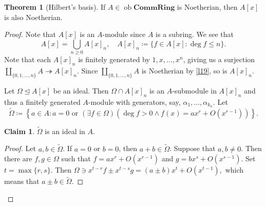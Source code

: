 \documentclass[10pt,letterpaper,cm]{nupset}
\theoremstyle{definition}
\theoremstyle{theorem}
\newtheorem{theorem}[definition]{Theorem}
\newtheorem*{claim}{Claim}
\theoremstyle{remark}
\newcommand{\1}{\mathbf{1}}
\newcommand{\0}{\vec 0}
\DeclareMathOperator{\ob}{ob}
\begin{document}
\begin{theorem}[Hilbert's basis] 
If $A\in \ob{\mathbf{CommRing}}$ is Noetherian, then $A\left[x\right]$ is also Noetherian. 
\end{theorem}
\begin{proof}
Note that $A\left[x\right]$ is an $A$-module since $A$ is a subring. We see that $$A\left[x\right] = \bigcup_{n\geq 0} A\left[x\right]_n, \quad A\left[x\right]_n \coloneqq \{f \in A\left[x\right] : \deg f \leq n\}.$$
Note that each $A\left[x\right]_n$ is finitely generated by $1, x, \ldots, x^n$, giving us a surjection $\coprod_{\{0, 1, \ldots, n\}}A \twoheadrightarrow A\left[x\right]_n$. Since $\coprod_{\{0, 1, \ldots, n\}}A$ is Noetherian by \cref{l19}, so is $A\left[x\right]_n$.

\medskip

 Let $\Omega \unlhd A\left[x\right]$ be an ideal. Then $\Omega \cap A\left[x\right]_n$ is an $A$-submodule in $A\left[x\right]_n$ and thus a finitely generated $A$-module with generators, say, $\alpha_1, \ldots, \alpha_{k_n}$. Let $$\widetilde{\Omega} \coloneqq  \left\{a\in A : a = 0 \text{ or } \left(\exists f\in \Omega\right)\left(\deg f >0 \land f(x) = ax^r+ O(x^{r-1})\right)\right\}.$$
\begin{claim}
$\widetilde{\Omega}$ is an ideal in $A$.
\end{claim}
\begin{proof}
Let $a,b \in \widetilde{\Omega}$. If $a=0$ or $b=0$, then $a+b\in \widetilde{\Omega}$. Suppose that $a,b\ne 0$. Then there are $f, g \in 
\Omega$ such that $f= ax^r + O(x^{r-1})$ and $g= bx^s + O(x^{s-1})$. Set $t=\max\{r, s\}$. Then ${\Omega} \ni x^{t-r}f \pm x^{t-s}g = \left(a\pm b\right)x^t +O(x^{t-1}),$ which means that $a\pm b \in \widetilde{\Omega}$.

\medskip



\end{proof}
\end{proof}
\end{document}
